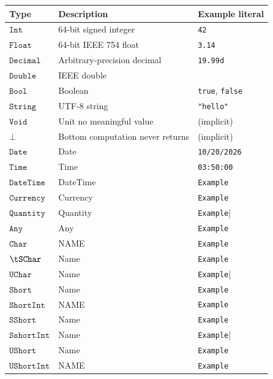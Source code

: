 \documentclass[11pt, letterpaper]{article}
\newcommand{\tInt}{\mathtt{Int}}
\newcommand{\tFloat}{\mathtt{Float}}
\newcommand{\tDecimal}{\mathtt{Decimal}}
\newcommand{\tDouble}{\texttt{Double}}
\newcommand{\tBool}{\mathtt{Bool}}
\newcommand{\tString}{\mathtt{String}}
\newcommand{\tVoid}{\mathtt{Void}}
\newcommand{\tBottom}{\bot}
\newcommand{\tDate}{\mathtt{{Date}}}
\newcommand{\tTime}{\mathtt{{Time}}}
\newcommand{\tDateTime}{\mathtt{{DateTime}}}
\newcommand{\tCurrency}{\mathtt{{Currency}}}
\newcommand{\tQuantity}{\mathtt{{Quantity}}}
\newcommand{\tAny}{\mathtt{{Any}}}
\newcommand{\tChar}{\mathtt{{Char}}}
\newcommand{\tUChar}{\mathtt{{UChar}}}
\newcommand{\tShort}{\mathtt{{Short}}}
\newcommand{\tChar}{\mathtt{{Char}}}
\newcommand{\tShortInt}{\mathtt{{Short Int}}}
\newcommand{\tSshort}{\mathtt{{SShort}}}
\newcommand{\tSshortint}{\mathtt{{Sshort Int}}}
\newcommand{\tUshort}{\mathtt{{UShort}}}
\newcommand{\tuShortInt}{\mathtt{{UShort Int}}}
\begin{document}
\begin{center}
\begin{tabular}{lll}
  \toprule
  \textbf{Type} & \textbf{Description} & \textbf{Example literal} \\
  \midrule
  $\tInt$     & 64-bit signed integer            & \lstinline|42| \\
  $\tFloat$   & 64-bit IEEE 754 float            & \lstinline|3.14| \\
  $\tDecimal$ & Arbitrary-precision decimal      & \lstinline|19.99d| \\
  $\tDouble$ & IEEE double  & \lstinline|24.77477747747\\
  $\tBool$    & Boolean                          & \lstinline|true|, \lstinline|false| \\
  $\tString$  & UTF-8 string                     & \lstinline|"hello"| \\
  $\tVoid$    & Unit  no meaningful value       & (implicit) \\
  $\tBottom$  & Bottom  computation never returns & (implicit) \\
  $\tDate$     & Date            & \lstinline|10/20/2026| \\
  $\tTime$   & Time         & \lstinline|03:50:00| \\
  $\tDateTime$ & DateTime     & \lstinline|Example| \\
  $\tCurrency$ & Currency  & \lstinline|Example|\\
  $\tQuantity$    & Quantity                         & \lstinline|Example|| \\
  $\tAny$  & Any                    & \lstinline|Example| \\
    $\tChar$ & NAME     & \lstinline|Example| \\
  $\tSChar$ & Name  & \lstinline|Example|\\
  $\tUChar$    & Name                        & \lstinline|Example|| \\
  $\tShort$  & Name                    & \lstinline|Example| \\
   $\tShortInt$ & NAME     & \lstinline|Example| \\
  $\tSshort$ & Name  & \lstinline|Example|\\
  $\tSshortint$    & Name                        & \lstinline|Example|| \\
  $\tUshort$  & Name                    & \lstinline|Example| \\
  $\tuShortInt$ & NAME     & \lstinline|Example| \\

\end{tabular}
\end{center}
\end{document}
